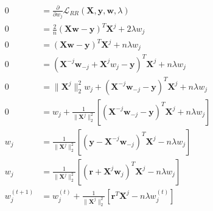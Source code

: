 \newcommand{\matrix}[1]{\mathbf{#1}}
\newcommand{\vector}[1]{\mathbf{#1}}
\newcommand{\X}{\matrix{X}}
\newcommand{\y}{\vector{y}}
\newcommand{\w}{\vector{w}}
\newcommand{\r}{\vector{r}}
\begin{align*}
0 &= \frac{\partial}{\partial w_j} \mathcal{L}_{\textit{RR}}(\X,\y,\w,\lambda) \\
0 &= \frac{2}{n} (\X\w - \y)^T \X^j + 2 \lambda w_j \\
0 &= (\X\w - \y)^T \X^j + n \lambda w_j \\
0 &= (\X^{-j}\w_{-j}  + \X^j w_j - \y)^T \X^j + n \lambda w_j \\
0 &= \|\X^j\|_2^2 w_j + (\X^{-j}\w_{-j} - \y)^T \X^j + n \lambda w_j \\
0 &= w_j + \frac{1}{\|\X^j\|_2^2} \left[ (\X^{-j}\w_{-j} - \y)^T \X^j + n \lambda w_j \right] \\
w_j &= \frac{1}{\|\X^j\|_2^2} \left[ (\y - \X^{-j}\w_{-j})^T \X^j - n \lambda w_j \right] \\
w_j &= \frac{1}{\|\X^j\|_2^2} \left[ (\r + \X^j \w_j)^T \X^j - n \lambda w_j \right] \\
w_j^{(t+1)} &= w_j^{(t)} + \frac{1}{\|\X^j\|_2^2} \left[ \r^T \X^j - n \lambda w_j^{(t)} \right] \\
\end{align*}
